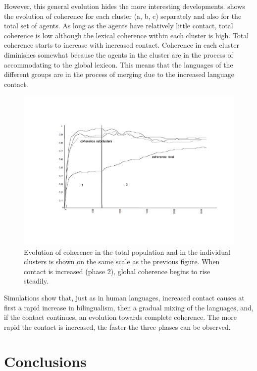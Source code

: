 However, this general evolution hides the more interesting
developments. 
shows the evolution of coherence for each
cluster (a, b, c) separately and
also for the total set of agents. As long as the agents
have relatively little contact, total coherence is low
although the lexical coherence within each cluster is high. 
Total coherence starts to increase with increased contact. Coherence in
each cluster diminishes somewhat because the agents in the
cluster are in the process of accommodating to the global lexicon. 
This means that the
languages of the different groups are in the process of
merging due to the increased language contact.


\begin{figure}[htbp]
  \centerline{\includegraphics[width=\textwidth]{chap5/figs/coherence.pdf}}
\caption{Evolution of coherence in the total population 
and in the individual clusters is shown on the same
scale as the previous figure. When contact 
is increased (phase 2), global coherence begins to rise steadily.}
\label{figure-coherence-in-space}
\end{figure}
Simulations show that, just as in human languages,
increased contact causes at first a rapid increase in
bilingualism, then a gradual mixing of the languages, and, 
if the contact
continues, an evolution towards complete coherence. 
The more rapid the contact is
increased, the faster the three phases can be observed. 

\section{Conclusions}


